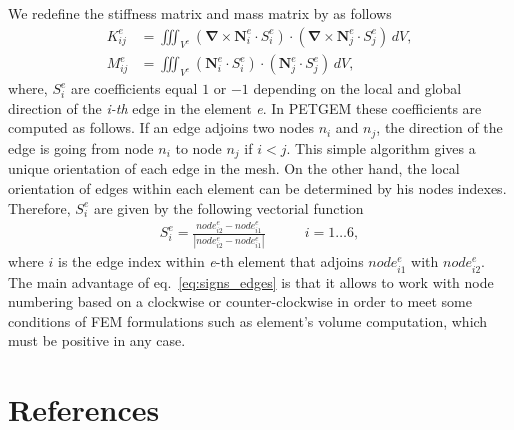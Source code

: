 \documentclass[review]{elsarticle}
\begin{document}
We redefine the stiffness matrix and mass matrix by \citet{Jin2002} as follows
\begin{align}
K^{e}_{ij} &= \iiint_{V^{e}} (\boldsymbol{\nabla} \times \mathbf{N}^{e}_{i} \cdot S^{e}_{i})  \cdot (\boldsymbol{\nabla} \times \mathbf{N}^{e}_{j} \cdot S^{e}_{j}) \mspace{3mu} d V, \label{eq:stiffness_matrix} \\
M^{e}_{ij} &= \iiint_{V^{e}} (\mathbf{N}^{e}_{i} \cdot S^{e}_{i}) \cdot (\mathbf{N}^{e}_{j} \cdot S^{e}_{j})\mspace{3mu} d V, \label{eq:mass_matrix}
\end{align}
where, $S^{e}_{i}$ are coefficients equal $1$ or $-1$ depending on the local and global direction of the \textit{i-th} edge in the element \textit{e}. In PETGEM  these coefficients are computed as follows. If an edge adjoins two nodes $n_{i}$ and $n_{j}$, the direction of the edge is going from node $n_{i}$ to node $n_{j}$ if $i < j$. This simple algorithm gives a unique orientation of each edge in the mesh. On the other hand, the local orientation of edges within each element can be determined by his nodes indexes. Therefore, $S^{e}_{i}$ are given by the following vectorial function
\begin{align}
S^{e}_{i} = \frac{node^{e}_{i2} - node^{e}_{i1}}{|node^{e}_{i2} - node^{e}_{i1}|} & \quad \quad i=1\ldots 6,
\label{eq:signs_edges}
\end{align}
where $i$ is the edge index within \textit{e}-th element that adjoins $node^{e}_{i1}$ with $node^{e}_{i2}$. The main advantage of eq.~\eqref{eq:signs_edges} is that it allows to work with node numbering based on a clockwise or counter-clockwise in order to meet some conditions of FEM formulations such as element's volume computation, which must be positive in any case.

\section*{References}

\end{document}
